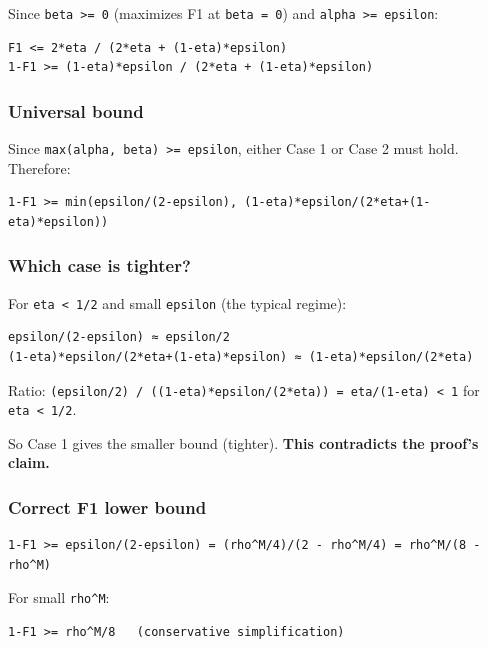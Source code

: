 \documentclass[
  12pt,
]{article}
\begin{document}
Since \texttt{beta\ \textgreater{}=\ 0} (maximizes F1 at
\texttt{beta\ =\ 0}) and \texttt{alpha\ \textgreater{}=\ epsilon}:

\begin{verbatim}
F1 <= 2*eta / (2*eta + (1-eta)*epsilon)
1-F1 >= (1-eta)*epsilon / (2*eta + (1-eta)*epsilon)
\end{verbatim}

\subsubsection{Universal bound}\label{universal-bound}

Since \texttt{max(alpha,\ beta)\ \textgreater{}=\ epsilon}, either Case
1 or Case 2 must hold. Therefore:

\begin{verbatim}
1-F1 >= min(epsilon/(2-epsilon), (1-eta)*epsilon/(2*eta+(1-eta)*epsilon))
\end{verbatim}

\subsubsection{Which case is tighter?}\label{which-case-is-tighter}

For \texttt{eta\ \textless{}\ 1/2} and small \texttt{epsilon} (the
typical regime):

\begin{verbatim}
epsilon/(2-epsilon) ≈ epsilon/2
(1-eta)*epsilon/(2*eta+(1-eta)*epsilon) ≈ (1-eta)*epsilon/(2*eta)
\end{verbatim}

Ratio:
\texttt{(epsilon/2)\ /\ ((1-eta)*epsilon/(2*eta))\ =\ eta/(1-eta)\ \textless{}\ 1}
for \texttt{eta\ \textless{}\ 1/2}.

So Case 1 gives the smaller bound (tighter). \textbf{This contradicts
the proof's claim.}

\subsubsection{Correct F1 lower bound}\label{correct-f1-lower-bound}

\begin{verbatim}
1-F1 >= epsilon/(2-epsilon) = (rho^M/4)/(2 - rho^M/4) = rho^M/(8 - rho^M)
\end{verbatim}

For small \texttt{rho\^{}M}:

\begin{verbatim}
1-F1 >= rho^M/8   (conservative simplification)
\end{verbatim}
\end{document}
